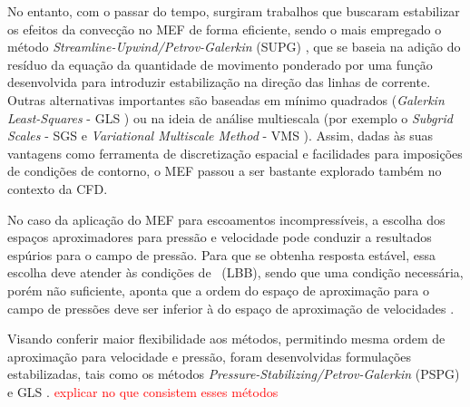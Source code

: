 No entanto, com o passar do tempo, surgiram trabalhos que buscaram estabilizar os efeitos da convecção no MEF de forma eficiente, sendo o mais empregado o método \textit{Streamline-Upwind/Petrov-Galerkin} (SUPG) \cite{brooks1982streamline}, que se baseia na adição do resíduo da equação da quantidade de movimento ponderado por uma função desenvolvida para introduzir estabilização na direção das linhas de corrente. Outras alternativas importantes são baseadas em mínimo quadrados (\textit{Galerkin Least-Squares} - GLS \cite{hughes1989new,tezduyar1991stabilized}) ou na ideia de análise multiescala (por exemplo o \textit{Subgrid Scales} - SGS \cite{piomelli1999large,hughes2000large} e \textit{Variational Multiscale Method} - VMS \cite{hughes1995multiscale,hughes1998variational,hughes2000large}). Assim, dadas às suas vantagens como ferramenta de discretização espacial e facilidades para imposições de condições de contorno, o MEF passou a ser bastante explorado também no contexto da CFD.


No caso da aplicação do MEF para escoamentos incompressíveis, a escolha dos espaços aproximadores para pressão e velocidade pode conduzir a resultados espúrios para o campo de pressão. Para que se obtenha resposta estável, essa escolha deve atender às condições de \LBB\ (LBB), sendo que uma condição necessária, porém não suficiente, aponta que a ordem do espaço de aproximação para o campo de pressões deve ser inferior à do espaço de aproximação de velocidades \cite{BrezziF1991,donea2003finite,fernandes2020tecnica}.

Visando conferir maior flexibilidade aos métodos, permitindo mesma ordem de aproximação para velocidade e pressão, foram desenvolvidas formulações estabilizadas, tais como os métodos \textit{Pressure-Stabilizing/Petrov-Galerkin} (PSPG) e GLS \cite{TezduyarS2003}. \textcolor{red}{explicar no que consistem esses métodos}

